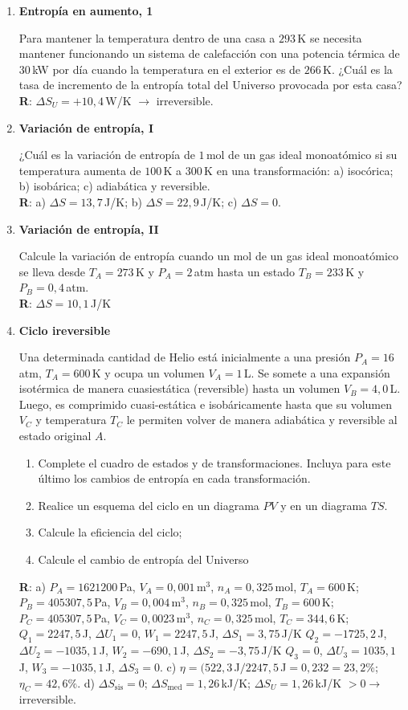\documentclass[a4paper,12pt]{article}
\begin{document}
\begin{enumerate}
	\item {\bf{Entropía en aumento, 1}}

		Para mantener la temperatura dentro de una casa a $293$\,K se necesita
		mantener funcionando un sistema de calefacción con una potencia térmica
		de $30$\,kW por día cuando la temperatura en el exterior es de
		$266$\,K.  ¿Cuál es la tasa de incremento de la entropía total del
		Universo provocada por esta casa?
		\\{\bf{R}}: $\Delta S_U=+10,4$\,W/K $\to$ irreversible.

	\item {\bf{Variación de entropía, I}}

		¿Cuál es la variación de entropía de $1$\,mol de un gas ideal
		monoatómico si su temperatura aumenta de $100$\,K a $300$\,K en una
		transformación: a) isocórica; b) isobárica; c) adiabática y reversible.
		\\{\bf{R}}: a) $\Delta S= 13,7$\,J/K; b) $\Delta S=22,9$\,J/K; c)
		$\Delta S=0$.
	
	\item {\bf{Variación de entropía, II}}
		
		Calcule la variación de entropía cuando un mol de un gas ideal
		monoatómico se lleva desde $T_A=273$\,K y $P_A=2$\,atm hasta un estado
		$T_B=233$\,K y $P_B=0,4$\,atm.
		\\{\bf{R}}: $\Delta S= 10,1$\,J/K

	\item {\bf{Ciclo ireversible}}

		Una determinada cantidad de Helio está inicialmente a una presión
		$P_A=16$\,atm, $T_A=600$\,K y ocupa un volumen $V_A=1$\,L. Se somete a
		una expansión isotérmica de manera cuasiestática (reversible) hasta un
		volumen $V_B=4,0$\,L. Luego, es comprimido cuasi-estática e
		isobáricamente hasta que su volumen $V_C$ y temperatura $T_C$ le
		permiten volver de manera adiabática y reversible al estado original
		$A$. 
		\begin{enumerate}
			\item Complete el cuadro de estados y de transformaciones. Incluya
				para este último los cambios de entropía en cada
				transformación. 
			\item Realice un esquema del ciclo en un diagrama $PV$ y en un
				diagrama $TS$. 
			\item Calcule la eficiencia del ciclo; 
			\item Calcule el cambio de entropía del Universo
		\end{enumerate}
        {\bf{R}}: a) 
		$P_A=1621200$\,Pa, $V_A=0,001$\,m$^3$, $n_A=0,325$\,mol, $T_A=600$\,K; 
		$P_B=405307,5$\,Pa, $V_B=0,004$\,m$^3$, $n_B=0,325$\,mol, $T_B=600$\,K; 
		$P_C=405307,5$\,Pa, $V_C=0,0023$\,m$^3$, $n_C=0,325$\,mol, $T_C=344,6$\,K;
		$Q_1=2247,5$\,J, $\Delta U_1=0$, $W_1=2247,5$\,J, $\Delta S_1=3,75$\,J/K
		$Q_2=-1725,2$\,J, $\Delta U_2=-1035,1$\,J, $W_2=-690,1$\,J, $\Delta S_2=-3,75$\,J/K
		$Q_3=0$, $\Delta U_3=1035,1$\,J, $W_3=-1035,1$\,J, $\Delta S_3=0$.
		c) $\eta=(522,3$\,J$/2247,5$\,J$ = 0,232 = 23,2\%$; $\eta_C=42,6\%$.
		d) $\Delta S_{\mathrm{sis}} = 0$; $\Delta S_{\mathrm{med}}=1,26$\,kJ/K;
		$\Delta S_U=1,26$\,kJ/K $>0 \to$ irreversible. 


\end{enumerate}
\end{document}
